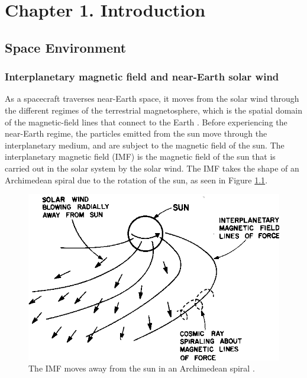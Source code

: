 \chapter{Chapter 1. Introduction}

\section{Space Environment}

\subsection{Interplanetary magnetic field and near-Earth solar wind}
As a spacecraft traverses near-Earth space, it moves from the solar wind through the different regimes of the terrestrial magnetosphere, which is the spatial domain of the magnetic-field lines that connect to the Earth \citep{Borovsky:2018}. Before experiencing the near-Earth regime, the particles emitted from the sun move through the interplanetary medium, and are subject to the magnetic field of the sun. The interplanetary magnetic field (\gls{IMF}) is the magnetic field of the sun that is carried out in the solar system by the solar wind. The IMF takes the shape of an Archimedean spiral due to the rotation of the sun, as seen in Figure \ref{fig:IMF-spiral}.

\begin{figure}
    \centering
    \includegraphics[width=\linewidth]{Figures/IMF.png}
    \caption[Diagram of the interplanetary magnetic field]{The IMF moves away from the sun in an Archimedean spiral \citep{Mccracken:1967}.}
    \label{fig:IMF-spiral}
\end{figure}

